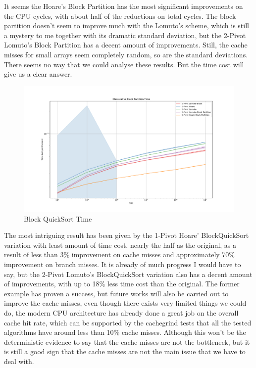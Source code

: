 \documentclass{article}
\begin{document}
It seems the Hoare's Block Partition has the most significant improvements on the CPU cycles, with about half of the reductions on total cycles.
The block partition doesn't seem to improve much with the Lomuto's scheme, which is still a mystery to me together with its dramatic standard deviation, but the 2-Pivot Lomuto's Block Partition has a decent amount of improvements.
Still, the cache misses for small arrays seem completely random, so are the standard deviations. There seems no way that we could analyse these results. But the time cost will give us a clear answer.

\begin{figure}[H]
    \hypertarget{fig:blocktime}{}
    \caption{Block QuickSort Time}
    \centering
    \hspace*{-0.27\textwidth}
    \includegraphics[width=1.5\textwidth]{Classical vs Block Partition Time.pdf}
\end{figure}

The most intriguing result has been given by the 1-Pivot Hoare' BlockQuickSort variation with least amount of time cost, nearly the half as the original, as a result of less than 3\% improvement on cache misses and approximately 70\% improvement on branch misses.
It is already of much progress I would have to say, but the 2-Pivot Lomuto's BlockQuickSort variation also has a decent amount of improvements, with up to 18\% less time cost than the original.
The former example has proven a success, but future works will also be carried out to improve the cache misses, even though there exists very limited things we could do,
the modern CPU architecture has already done a great job on the overall cache hit rate, which can be supported by the cachegrind tests that all the tested algorithms have around less than 10\% cache misses.
Although this won't be the deterministic evidence to say that the cache misses are not the bottleneck, but it is still a good sign that the cache misses are not the main issue that we have to deal with.
\end{document}
